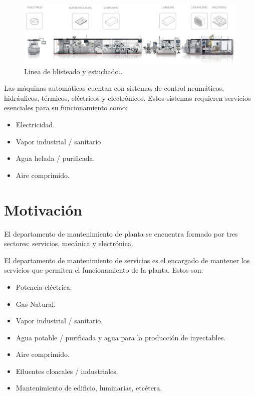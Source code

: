 \begin{figure}[htbp]
	\centering
	\includegraphics[width=1\textwidth]{./Figures/IMA.png}
	\caption{Linea de blisteado y estuchado.\protect\footnotemark.}
	\label{fig:LINEA}
\end{figure}


Las máquinas automáticas cuentan con sistemas de control neumáticos, hidráulicos, térmicos, eléctricos y electrónicos. Estos sistemas requieren servicios esenciales para su funcionamiento como:
 
\begin{itemize}
	\item Electricidad.
	\item Vapor industrial / sanitario
	\item Agua helada / purificada.
	\item Aire comprimido.
\end{itemize}


\section{Motivación}

El departamento de mantenimiento de planta se encuentra formado por tres sectores: servicios, mecánica y electrónica.

El departamento de mantenimiento de servicios es el encargado de mantener los servicios que permiten el funcionamiento de la planta. Estos son:

\begin{itemize}
	\item Potencia eléctrica.
	\item Gas Natural.
	\item Vapor industrial / sanitario.
	\item Agua potable / purificada y agua para la producción de inyectables.
	\item Aire comprimido.
	\item Efluentes cloacales / industriales.
	\item Mantenimiento de edificio, luminarias, etcétera.
\end{itemize}

